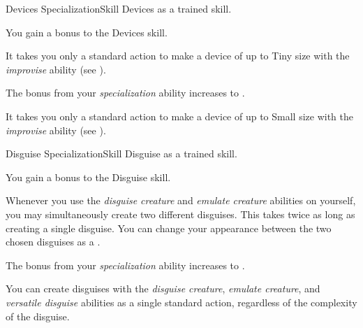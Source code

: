   \begin{feat}{Devices Specialization}{Skill}
    \featpre Devices as a trained skill.

     You gain a  bonus to the Devices skill.

     It takes you only a standard action to make a device of up to Tiny size with the \textit{improvise} ability (see ).

     The bonus from your \textit{specialization} ability increases to .

     It takes you only a standard action to make a device of up to Small size with the \textit{improvise} ability (see ).
  \end{feat}

  \begin{feat}{Disguise Specialization}{Skill}
    \featpre Disguise as a trained skill.

     You gain a  bonus to the Disguise skill.

     Whenever you use the \textit{disguise creature} and \textit{emulate creature} abilities on yourself, you may simultaneously create two different disguises.
    This takes twice as long as creating a single disguise.
    You can change your appearance between the two chosen disguises as a .

     The bonus from your \textit{specialization} ability increases to .

     You can create disguises with the \textit{disguise creature}, \textit{emulate creature}, and \textit{versatile disguise} abilities as a single standard action, regardless of the complexity of the disguise.
  \end{feat}

